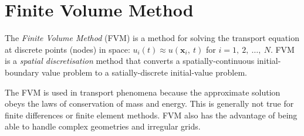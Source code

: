\documentclass{article}
\begin{document}
\section{Finite Volume Method}
The \textit{Finite Volume Method} (FVM) is a method for solving the
transport equation at discrete points (nodes) in space: \(u_i\left( t
\right) \approx u\left( \symbf{x}_i,\: t \right)\) for \(i = 1,\: 2,\:
\ldots,\: N\). FVM is a \textit{spatial discretisation} method that
converts a spatially-continuous initial-boundary value problem to a
satially-discrete initial-value problem.

The FVM is used in transport phenomena because the approximate solution
obeys the laws of conservation of mass and energy. This is generally
not true for finite differences or finite element methods. FVM also has
the advantage of being able to handle complex geometries and irregular
grids.
\end{document}
